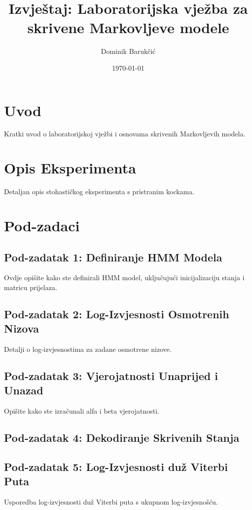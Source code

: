 \documentclass[12pt]{article}
\title{Izvještaj: Laboratorijska vježba za skrivene Markovljeve modele}
\author{Dominik Barukčić}
\date{\today}
\begin{document}
	
	\maketitle
	
	\section{Uvod}
	Kratki uvod o laboratorijskoj vježbi i osnovama skrivenih Markovljevih modela.
	
	\section{Opis Eksperimenta}
	Detaljan opis stohastičkog eksperimenta s pristranim kockama.
	
	\section{Pod-zadaci}
	\subsection{Pod-zadatak 1: Definiranje HMM Modela}
	Ovdje opišite kako ste definirali HMM model, uključujući inicijalizaciju stanja i matricu prijelaza.
	
	\subsection{Pod-zadatak 2: Log-Izvjesnosti Osmotrenih Nizova}
	Detalji o log-izvjesnostima za zadane osmotrene nizove.
	
	\subsection{Pod-zadatak 3: Vjerojatnosti Unaprijed i Unazad}
	Opišite kako ste izračunali alfa i beta vjerojatnosti.
	
	\subsection{Pod-zadatak 4: Dekodiranje Skrivenih Stanja}
	
	\subsection{Pod-zadatak 5: Log-Izvjesnosti duž Viterbi Puta}
	Usporedba log-izvjesnosti duž Viterbi puta s ukupnom log-izvjesnošću.
	
\end{document}

